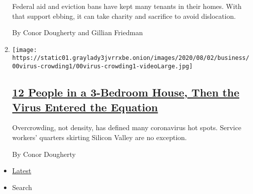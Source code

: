\begin{enumerate}
  Federal aid and eviction bans have kept many tenants in their homes.
  With that support ebbing, it can take charity and sacrifice to avoid
  dislocation.

  By Conor Dougherty and Gillian Friedman
\item
  \texttt{[image: https://static01.graylady3jvrrxbe.onion/images/2020/08/02/business/00virus-crowding1/00virus-crowding1-videoLarge.jpg]}

  \hypertarget{12-people-in-a-3-bedroom-house-then-the-virus-entered-the-equation}{%
  \subsection{\texorpdfstring{\href{/2020/08/01/business/economy/housing-overcrowding-coronavirus.html}{12
  People in a 3-Bedroom House, Then the Virus Entered the
  Equation}}{12 People in a 3-Bedroom House, Then the Virus Entered the Equation}}\label{12-people-in-a-3-bedroom-house-then-the-virus-entered-the-equation}}

  Overcrowding, not density, has defined many coronavirus hot spots.
  Service workers' quarters skirting Silicon Valley are no exception.

  By Conor Dougherty
\end{enumerate}

\begin{itemize}
\tightlist
\item
  \protect\hyperlink{stream-panel}{Latest}
\item
  Search
\end{itemize}

